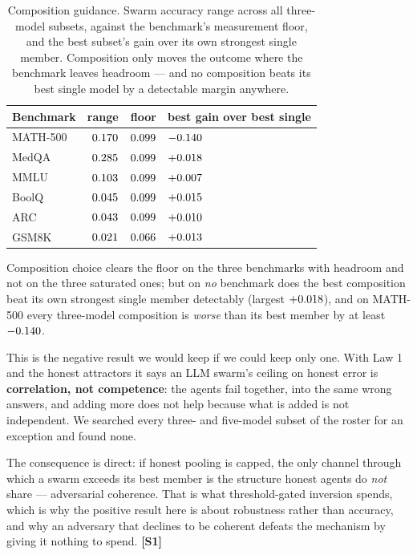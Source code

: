 \begin{table}[t]
\centering
\caption{Composition guidance. Swarm accuracy range across all three-model
subsets, against the benchmark's measurement floor, and the best subset's gain
over its own strongest single member. Composition only moves the outcome where
the benchmark leaves headroom --- and no composition beats its best single model
by a detectable margin anywhere.}
\label{tab:composition}
\small
\begin{tabular}{@{}lrrl@{}}
\toprule
Benchmark & range & floor & best gain over best single \\
\midrule
MATH-500 & $0.170$ & $0.099$ & $-0.140$ \\
MedQA    & $0.285$    & $0.099$    & $+0.018$ \\
MMLU     & $0.103$     & $0.099$     & $+0.007$ \\
BoolQ    & $0.045$    & $0.099$    & $+0.015$ \\
ARC      & $0.043$      & $0.099$      & $+0.010$ \\
GSM8K    & $0.021$     & $0.066$     & $+0.013$ \\
\bottomrule
\end{tabular}
\end{table}

Composition choice clears the floor on the three benchmarks with headroom and not
on the three saturated ones; but on \emph{no} benchmark does the best composition
beat its own strongest single member detectably (largest
$+0.018$), and on MATH-500 every three-model composition is
\emph{worse} than its best member by at least $-0.140$.

This is the negative result we would keep if we could keep only one. With Law 1
and the honest attractors it says an LLM swarm's ceiling on honest error is
\textbf{correlation, not competence}: the agents fail together, into the same
wrong answers, and adding more does not help because what is added is not
independent. We searched every three- and five-model subset of the roster for an
exception and found none.

The consequence is direct: if honest pooling is capped, the only channel through
which a swarm exceeds its best member is the structure honest agents do
\emph{not} share --- adversarial coherence. That is what threshold-gated
inversion spends, which is why the positive result here is about robustness
rather than accuracy, and why an adversary that declines to be coherent defeats
the mechanism by giving it nothing to spend. \textbf{[S1]}

